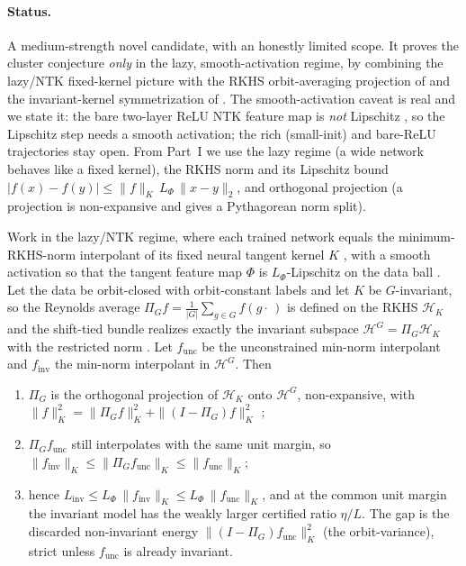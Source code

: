 \paragraph{Status.}
A medium-strength novel candidate, with an honestly limited scope. It proves the cluster conjecture
\emph{only} in the lazy, smooth-activation regime, by combining the lazy/NTK fixed-kernel picture
\citep{jacot2018,chizat2019} with the RKHS orbit-averaging projection of \citet{elesedy2021} and
the invariant-kernel symmetrization of \citet{haasdonk2007}. The smooth-activation caveat is
real and we state it: the bare two-layer ReLU NTK feature map is \emph{not} Lipschitz
\citep{biettimairal2019}, so the Lipschitz step needs a smooth activation; the rich (small-init)
and bare-ReLU trajectories stay open. From Part~I we use the lazy regime (a wide network behaves like
a fixed kernel), the RKHS norm and its Lipschitz bound $|f(x)-f(y)| \le \|f\|_K\,L_\Phi\,\|x-y\|_2$,
and orthogonal projection (a projection is non-expansive and gives a Pythagorean norm split).

\begin{theorem}
\label{thm:lazy}
Work in the lazy/NTK regime, where each trained network equals the minimum-RKHS-norm interpolant of
its fixed neural tangent kernel $K$ \citep{jacot2018,chizat2019}, with a smooth activation so that the
tangent feature map $\Phi$ is $L_\Phi$-Lipschitz on the data ball \citep{biettimairal2019}. Let the
data be orbit-closed with orbit-constant labels and let $K$ be $G$-invariant, so the Reynolds average
$\Pi_G f = \frac1{|G|}\sum_{g\in G} f(g\cdot\,)$ is defined on the RKHS $\mathcal H_K$ and the
shift-tied bundle realizes exactly the invariant subspace $\mathcal H^G = \Pi_G\mathcal H_K$ with the
restricted norm \citep{haasdonk2007}. Let $f_{\mathrm{unc}}$ be the unconstrained min-norm
interpolant and $f_{\mathrm{inv}}$ the min-norm interpolant in $\mathcal H^G$. Then
\begin{enumerate}[leftmargin=1.7em,label=\textup{(\roman*)}]
\item $\Pi_G$ is the orthogonal projection of $\mathcal H_K$ onto $\mathcal H^G$, non-expansive, with
$\|f\|_K^2 = \|\Pi_G f\|_K^2 + \|(I-\Pi_G)f\|_K^2$ \citep{elesedy2021};
\item $\Pi_G f_{\mathrm{unc}}$ still interpolates with the same unit margin, so
$\|f_{\mathrm{inv}}\|_K \le \|\Pi_G f_{\mathrm{unc}}\|_K \le \|f_{\mathrm{unc}}\|_K$;
\item hence $L_{\mathrm{inv}} \le L_\Phi\,\|f_{\mathrm{inv}}\|_K \le L_\Phi\,\|f_{\mathrm{unc}}\|_K$,
and at the common unit margin the invariant model has the weakly larger certified ratio $\eta/L$. The
gap is the discarded non-invariant energy $\|(I-\Pi_G)f_{\mathrm{unc}}\|_K^2$ (the orbit-variance),
strict unless $f_{\mathrm{unc}}$ is already invariant.
\end{enumerate}
\end{theorem}

